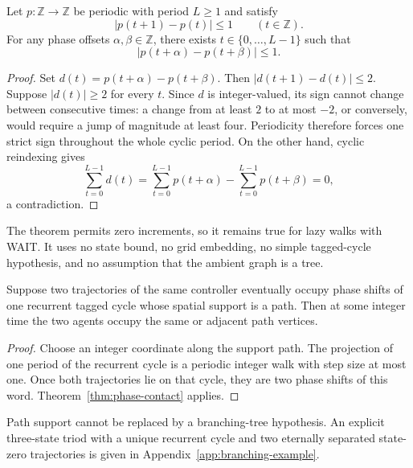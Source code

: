 \begin{theorem}\label{thm:phase-contact}
Let $p:\mathbb Z\to\mathbb Z$ be periodic with period $L\ge1$ and satisfy
\[
 |p(t+1)-p(t)|\le1\qquad(t\in\mathbb Z).
\]
For any phase offsets $\alpha,\beta\in\mathbb Z$, there exists $t\in\{0,\ldots,L-1\}$ such that
\[
 \boxed{|p(t+\alpha)-p(t+\beta)|\le1.}
\]
\end{theorem}
\begin{proof}
Set $d(t)=p(t+\alpha)-p(t+\beta)$.  Then $|d(t+1)-d(t)|\le2$.  Suppose $|d(t)|\ge2$ for every $t$.  Since $d$ is integer-valued, its sign cannot change between consecutive times: a change from at least $2$ to at most $-2$, or conversely, would require a jump of magnitude at least four.  Periodicity therefore forces one strict sign throughout the whole cyclic period.  On the other hand, cyclic reindexing gives
\[
 \sum_{t=0}^{L-1}d(t)
 =\sum_{t=0}^{L-1}p(t+\alpha)-\sum_{t=0}^{L-1}p(t+\beta)=0,
\]
a contradiction.
\end{proof}

The theorem permits zero increments, so it remains true for lazy walks with WAIT.  It uses no state bound, no grid embedding, no simple tagged-cycle hypothesis, and no assumption that the ambient graph is a tree.

\begin{corollary}\label{cor:same-cycle-path-contact}
Suppose two trajectories of the same controller eventually occupy phase shifts of one recurrent tagged cycle whose spatial support is a path.  Then at some integer time the two agents occupy the same or adjacent path vertices.
\end{corollary}
\begin{proof}
Choose an integer coordinate along the support path.  The projection of one period of the recurrent cycle is a periodic integer walk with step size at most one.  Once both trajectories lie on that cycle, they are two phase shifts of this word.  Theorem~\ref{thm:phase-contact} applies.
\end{proof}

Path support cannot be replaced by a branching-tree hypothesis. An explicit
three-state triod with a unique recurrent cycle and two eternally separated state-zero
trajectories is given in Appendix~\ref{app:branching-example}.
